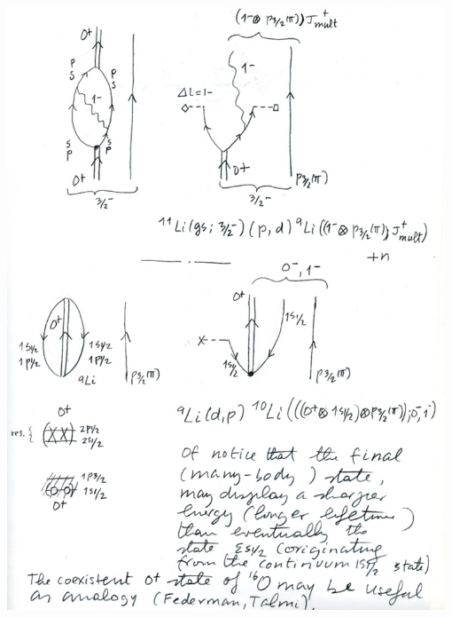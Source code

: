 \documentclass[a4paper,onecolumn,superscriptaddress,12pt,nofootinbib,twoside,raggedfooter,notitlepage]{revtex4-1}
\begin{document}
\begin{center}
	\includegraphics[width=0.98\textwidth]{figs/fig_c5}
\end{center}
\end{document}
